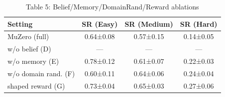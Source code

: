 \begin{table}[htbp]
\centering
\caption{Table 5: Belief/Memory/DomainRand/Reward ablations}
\begin{tabular}{lccc}
\toprule
Setting & SR (Easy) & SR (Medium) & SR (Hard) \\
\midrule
MuZero (full) & 0.64±0.08 & 0.57±0.15 & 0.14±0.05 \\
w/o belief (D) & — & — & — \\
w/o memory (E) & 0.78±0.12 & 0.61±0.07 & 0.22±0.03 \\
w/o domain rand. (F) & 0.60±0.11 & 0.64±0.06 & 0.24±0.04 \\
shaped reward (G) & 0.73±0.04 & 0.65±0.03 & 0.27±0.06 \\
\bottomrule
\end{tabular}
\end{table}
